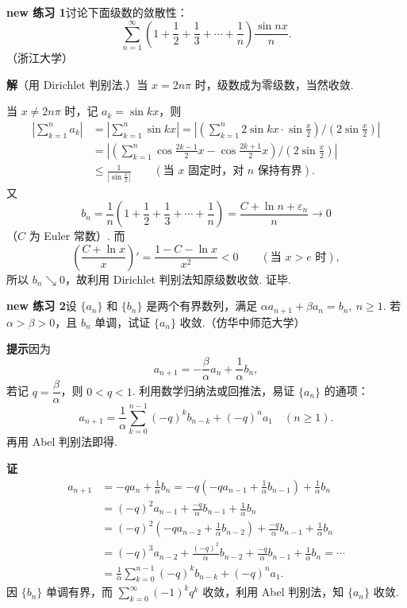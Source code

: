 \documentclass[UTF8, 12pt, fontset=fandol, oneside]{ctexart}
\begin{document}
\noindent\textbf{new 练习 1}\quad 讨论下面级数的敛散性：
\[
  \sum_{n=1}^{\infty}\left(1+\frac12+\frac13+\cdots+\frac1n\right)\frac{\sin nx}{n}.
\]
（浙江大学）

\noindent\textbf{解}\quad （用 Dirichlet 判别法.）当 $x=2n\pi$ 时，级数成为零级数，当然收敛.

当 $x\ne2n\pi$ 时，记 $a_k=\sin kx$，则
\[
\begin{aligned}
  \left|\sum_{k=1}^n a_k\right|
  &=\left|\sum_{k=1}^n\sin kx\right|
   =\left|\left(\sum_{k=1}^n2\sin kx\cdot\sin\frac x2\right)\bigg/\left(2\sin\frac x2\right)\right|\\
  &=\left|\left(\sum_{k=1}^n\cos\frac{2k-1}{2}x-\cos\frac{2k+1}{2}x\right)\bigg/\left(2\sin\frac x2\right)\right|\\
  &\le\frac1{\left|\sin\frac x2\right|}
  \qquad(\text{当 }x\text{ 固定时，对 }n\text{ 保持有界}).
\end{aligned}
\]
又
\[
  b_n=\frac1n\left(1+\frac12+\frac13+\cdots+\frac1n\right)
  =\frac{C+\ln n+\varepsilon_n}{n}\to0
\]
（$C$ 为 Euler 常数）. 而
\[
  \left(\frac{C+\ln x}{x}\right)'=\frac{1-C-\ln x}{x^2}<0
  \qquad(\text{当 }x>e\text{ 时}),
\]
所以 $b_n\searrow0$，故利用 Dirichlet 判别法知原级数收敛. 证毕.

\noindent\textbf{new 练习 2}\quad 设 $\{a_n\}$ 和 $\{b_n\}$ 是两个有界数列，满足
$\alpha a_{n+1}+\beta a_n=b_n,\ n\ge1$. 若 $\alpha>\beta>0$，且 $b_n$ 单调，试证 $\{a_n\}$ 收敛.（仿华中师范大学）

\noindent\textbf{提示}\quad 因为
\[
  a_{n+1}=-\frac{\beta}{\alpha}a_n+\frac1\alpha b_n,
\]
若记 $q=\dfrac{\beta}{\alpha}$，则 $0<q<1$. 利用数学归纳法或回推法，易证 $\{a_n\}$ 的通项：
\[
  a_{n+1}=\frac1\alpha\sum_{k=0}^{n-1}(-q)^k b_{n-k}+(-q)^n a_1\quad(n\ge1).
\]
再用 Abel 判别法即得.

\noindent\textbf{证}\quad
\[
\begin{aligned}
  a_{n+1}
  &=-qa_n+\frac1\alpha b_n
   =-q\left(-qa_{n-1}+\frac1\alpha b_{n-1}\right)+\frac1\alpha b_n\\
  &=(-q)^2a_{n-1}+\frac{-q}{\alpha}b_{n-1}+\frac1\alpha b_n\\
  &=(-q)^2\left(-qa_{n-2}+\frac1\alpha b_{n-2}\right)
    +\frac{-q}{\alpha}b_{n-1}+\frac1\alpha b_n\\
  &=(-q)^3a_{n-2}+\frac{(-q)^2}{\alpha}b_{n-2}
    +\frac{-q}{\alpha}b_{n-1}+\frac1\alpha b_n=\cdots\\
  &=\frac1\alpha\sum_{k=0}^{n-1}(-q)^k b_{n-k}+(-q)^n a_1.
\end{aligned}
\]
因 $\{b_n\}$ 单调有界，而 $\displaystyle\sum_{k=0}^{\infty}(-1)^kq^k$ 收敛，利用 Abel 判别法，知 $\{a_n\}$ 收敛.
\end{document}
